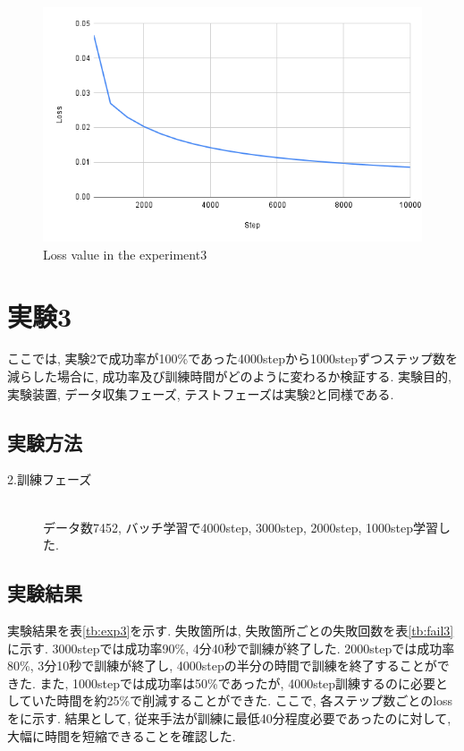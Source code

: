 \newpage
\begin{figure}[h]
  \centering
  \includegraphics[keepaspectratio, scale=0.5]{images/exp3_10000.png}
  \caption{Loss value in the experiment3}
  \label{Fig:exp2.2-10000}
  \end{figure}

\newpage
\section{実験3}
ここでは, 実験2で成功率が100\%であった4000stepから1000stepずつステップ数を減らした場合に, 成功率及び訓練時間がどのように変わるか検証する. 実験目的, 実験装置, データ収集フェーズ, テストフェーズは実験2と同様である. 

\subsection{実験方法}
\begin{description}
  \item[2.訓練フェーズ]\mbox{}\\データ数7452, バッチ学習で4000step, 3000step, 2000step, 1000step学習した. 
\end{description}

\subsection{実験結果}
実験結果を表\ref{tb:exp3}を示す. 失敗箇所は, 失敗箇所ごとの失敗回数を表\ref{tb:fail3}に示す. 3000stepでは成功率90\%, 4分40秒で訓練が終了した. 2000stepでは成功率80\%, 3分10秒で訓練が終了し, 4000stepの半分の時間で訓練を終了することができた. また, 1000stepでは成功率は50\%であったが, 4000step訓練するのに必要としていた時間を約25\%で削減することができた. ここで, 各ステップ数ごとのlossをに示す. 結果として, 従来手法が訓練に最低40分程度必要であったのに対して, 大幅に時間を短縮できることを確認した. 

